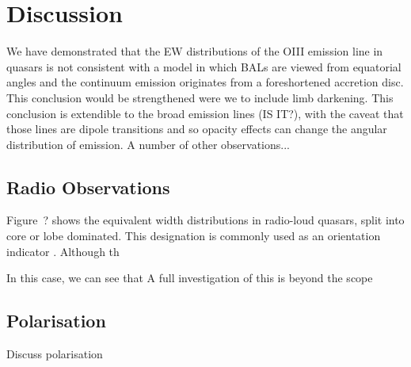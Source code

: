 \section{Discussion}

We have demonstrated that the EW distributions of the OIII emission line
in quasars is not consistent with a model in which BALs are 
viewed from equatorial angles and the continuum emission originates from
a foreshortened accretion disc. This conclusion would be strengthened were 
we to include limb darkening. This conclusion is extendible to the broad 
emission lines (IS IT?), with the caveat that those lines are dipole 
transitions and so opacity effects can change the angular distribution of emission.
A number of other observations...



\subsection{Radio Observations}

Figure~? shows the equivalent width distributions in radio-loud quasars, 
split into core or lobe dominated. This designation is commonly used
as an orientation indicator \citep{orr1982,wills1995}. 
Although th


In this case, we can
see that 
A full investigation of this is beyond the scope 



\subsection{Polarisation}

Discuss polarisation

